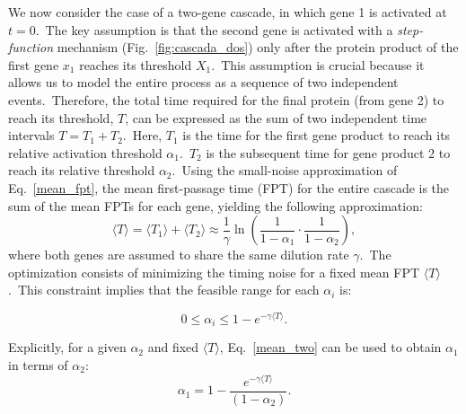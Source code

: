 \documentclass[aps,prb,reprint,superscriptaddress]{revtex4-2}
\begin{document}
We now consider the case of a two-gene cascade, in which gene 1 is activated at $t=0$.~The key assumption is that the second gene is activated with a \textit{step-function} mechanism (Fig.~\ref{fig:cascada_dos}) only after the protein product of the first gene $x_1$ reaches its threshold $X_1$.~This assumption is crucial because it allows us to model the entire process as a sequence of two independent events.~Therefore, the total time required for the final protein (from gene 2) to reach its threshold, $T$, can be expressed as the sum of two independent time intervals $T = T_1 + T_2$.~Here, $T_1$ is the time for the first gene product to reach its relative activation threshold $\alpha_1$.~$T_2$ is the subsequent time for gene product 2 to reach its relative threshold $\alpha_2$.~Using the small-noise approximation of Eq.~\eqref{mean_fpt}, the mean first-passage time (FPT) for the entire cascade is the sum of the mean FPTs for each gene, yielding the following approximation:
\begin{equation}\label{mean_two}
\langle T \rangle=\langle T_1 \rangle + \langle T_2 \rangle
\approx \frac{1}{\gamma} \ln{\left( \frac{1}{1 - \alpha_1} \cdot \frac{1}{1 - \alpha_2} \right)},
\end{equation}
where both genes are assumed to share the same dilution rate $\gamma$.~The optimization consists of minimizing the timing noise for a fixed mean FPT $\langle T\rangle$.~This constraint implies that the feasible range for each $\alpha_i$ is:

\begin{equation}\label{eq:range}    0\leq\alpha_i\leq1-e^{-\gamma\langle T\rangle}.
\end{equation}

Explicitly, for a given $\alpha_2$ and fixed $\langle T\rangle$, Eq.~\eqref{mean_two} can be used to obtain $\alpha_1$ in terms of $\alpha_2$:
\begin{equation}\label{eq:constraint}
    \alpha_1=1-\frac{e^{-\gamma\langle T\rangle}}{(1-\alpha_2)}.
\end{equation}
\end{document}
